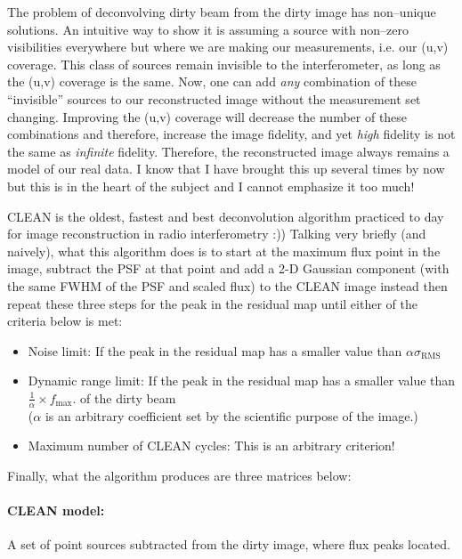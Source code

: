 \documentclass[paper=a4, fontsize=11pt]{scrartcl} %
\numberwithin{equation}{section} %
\numberwithin{figure}{section} %
\numberwithin{table}{section} %
\begin{document}
The problem of deconvolving dirty beam from the dirty image has non--unique solutions. An intuitive way to show it is assuming a source with non--zero visibilities everywhere but where we are making our measurements, i.e. our (u,v) coverage. This class of sources remain invisible to the interferometer, as long as the (u,v) coverage is the same. Now, one can add \emph{any} combination of these ``invisible'' sources to our reconstructed image without the measurement set changing. Improving the (u,v) coverage will decrease the number of these combinations and therefore, increase the image fidelity, and yet \emph{high} fidelity is not the same as \emph{infinite} fidelity. Therefore, the reconstructed image always remains a model of our real data. I know that I have brought this up several times by now but this is in the heart of the subject and I cannot emphasize it too much!



CLEAN is the oldest, fastest and best deconvolution algorithm practiced to day for image reconstruction in radio interferometry :)) Talking very briefly (and naively), what this algorithm does is to start at the maximum flux point in the image, subtract the PSF at that point and add a 2-D Gaussian component (with the same FWHM of the PSF and scaled flux) to the CLEAN image instead then repeat these three steps for the peak in the residual map until either of the criteria below is met: 
\begin{itemize}
\item Noise limit: If the peak in the residual map has a smaller value than $\alpha \sigma_\mathrm{RMS}$ 
\item Dynamic range limit: If the peak in the residual map has a smaller value than $\frac{1}{\alpha} \times f_\mathrm{max}$. of the dirty beam
\\($\alpha$ is an arbitrary coefficient set by the scientific purpose of the image.)
\item Maximum number of CLEAN cycles: This is an arbitrary criterion!
\end{itemize}


Finally, what the algorithm produces are three matrices below:
\paragraph*{CLEAN model:} A set of point sources subtracted from the dirty image, where flux peaks located.
\end{document}
